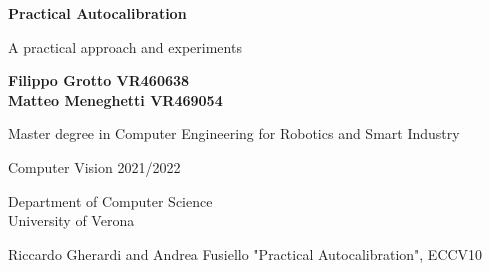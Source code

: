 \documentclass[14pt]{article}
\begin{document}
\begin{titlepage}
\begin{center}
    \vspace*{1cm}    
    \textbf{\LARGE Practical Autocalibration}

    \vspace{0.5cm}
    A practical approach and experiments
            
    \vspace{1.5cm}

    \textbf{Filippo Grotto VR460638 \\ Matteo Meneghetti VR469054}

    \vspace{0.5cm}
    Master degree in Computer Engineering for Robotics and Smart Industry

    \vfill
            
    Computer Vision 2021/2022
            
    \vspace{0.8cm}
                
    Department of Computer Science\\
    University of Verona\\
            
\end{center}
\end{titlepage}

\tableofcontents

\begin{thebibliography}{100}
    \addtolength{\leftmargin}{0.2in}
    \setlength{\itemindent}{-0.2in}

     Riccardo Gherardi and Andrea Fusiello "Practical Autocalibration", ECCV10
\end{thebibliography}
\end{document}
